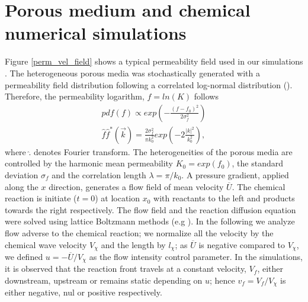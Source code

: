 \documentclass[doublecol]{epl2}
\begin{document}

\section{Porous medium and chemical numerical simulations}
Figure \ref{perm_vel_field} shows a typical permeability field used in our simulations \cite{talon03}.
 The heterogeneous porous media was stochastically generated with a permeability field distribution following a correlated log-normal distribution (\cite{gelhar83}). Therefore, the permeability logarithm, $f=ln(K)$ follows
\begin{eqnarray}
pdf(f)\propto exp(-\frac{(f-f_0)^2}{2\sigma_f^2}) \\
\hat f \hat f^*(\vec k) = \frac{2 \sigma_f^2}{\pi k_0^2}  exp(-2 \frac{|k|^2}{k^2_0}),
\end{eqnarray}
where $\hat .$ denotes Fourier transform.
The heterogeneities of the porous media are controlled by the harmonic mean permeability $K_0 = exp(f_0)$, the standard deviation $\sigma_f$ and the correlation length  $\lambda = \pi / k_0$.
 A pressure gradient, applied along the $x$ direction, generates a flow field of mean velocity $\overline{U}$.
  The chemical reaction is initiate ($t = 0$) at location $x_0$ with reactants to the left and products towards the right respectively. 
The flow field and the reaction diffusion equation were solved using lattice Boltzmann methods (e.g \cite{talon03,talon04b,jarrige10a}).
In the following we analyze flow adverse to the chemical reaction; we normalize all the velocity by the chemical wave velocity $V_{\chi}$ and the length by $l_{\chi}$; as $\overline{U}$ is negative compared to $V_{\chi}$, we defined $u=-\overline{U}/V_{\chi}$ as the flow intensity control parameter.
In the simulations, it is observed that the reaction front travels at a constant velocity, $V_f$, either downstream, upstream or remains static depending on $u$; hence $v_f=V_f/V_{\chi}$ is either negative, nul or positive respectively.
\end{document}
